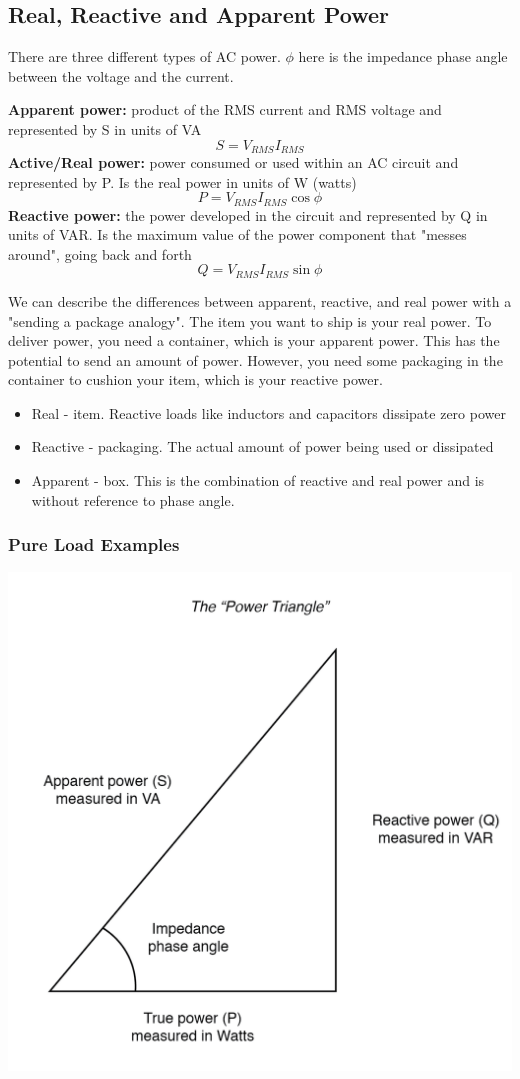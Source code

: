 \subsection{Real, Reactive and Apparent Power}
There are three different types of AC power. $\phi$ here is the impedance phase angle between the voltage and the current.
\begin{define}
    \textbf{Apparent power:} product of the RMS current and RMS voltage and represented by S in units of VA
    \[S = V_{RMS} I_{RMS}\]
    \textbf{Active/Real power:} power consumed or used within an AC circuit and represented by P. Is the real power in units of W (watts)
    \[P = V_{RMS} I_{RMS} \cos{\phi}\]
    \textbf{Reactive power:} the power developed in the circuit and represented by Q in units of VAR. Is the maximum value of the power component that "messes around", going back and forth
    \[Q = V_{RMS} I_{RMS} \sin{\phi}\]
\end{define}

We can describe the differences between apparent, reactive, and real power with a "sending a package analogy". The item you want to ship is your real power. To deliver power, you need a container, which is your apparent power. This has the potential to send an amount of power. However, you need some packaging in the container to cushion your item, which is your reactive power.
\begin{itemize}
    \item Real - item. Reactive loads like inductors and capacitors dissipate zero power
    \item Reactive - packaging. The actual amount of power being used or dissipated
    \item Apparent - box. This is the combination of reactive and real power and is without reference to phase angle.
\end{itemize}

\subsubsection{Pure Load Examples}


\begin{center}
    \includegraphics[scale=0.2]{figs/1_1_2_power_triangle.png}
\end{center}